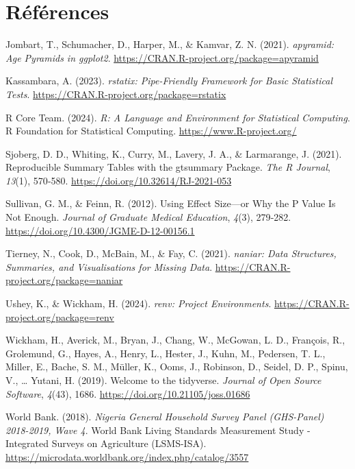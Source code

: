 \documentclass[
  10pt,
]{article}
\newlength{\cslhangindent}
\newenvironment{CSLReferences}[2] %
 {\begin{list}{}{%
  \setlength{\itemindent}{0pt}
  \setlength{\leftmargin}{0pt}
  \setlength{\parsep}{0pt}
  \ifodd #1
   \setlength{\leftmargin}{\cslhangindent}
   \setlength{\itemindent}{-1\cslhangindent}
  \fi
  \setlength{\itemsep}{#2\baselineskip}}}
 {\end{list}}
\begin{document}
\newpage{}

\section*{Références}\label{ruxe9fuxe9rences}

\label{refs}
\begin{CSLReferences}{1}{0}
Jombart, T., Schumacher, D., Harper, M., \& Kamvar, Z. N. (2021).
\emph{apyramid: Age Pyramids in ggplot2}.
\url{https://CRAN.R-project.org/package=apyramid}

Kassambara, A. (2023). \emph{rstatix: Pipe-Friendly Framework for Basic
Statistical Tests}. \url{https://CRAN.R-project.org/package=rstatix}

R Core Team. (2024). \emph{R: A Language and Environment for Statistical
Computing}. R Foundation for Statistical Computing.
\url{https://www.R-project.org/}

Sjoberg, D. D., Whiting, K., Curry, M., Lavery, J. A., \& Larmarange, J.
(2021). Reproducible Summary Tables with the gtsummary Package.
\emph{The R Journal}, \emph{13}(1), 570‑580.
\url{https://doi.org/10.32614/RJ-2021-053}

Sullivan, G. M., \& Feinn, R. (2012). Using Effect Size---or Why the P
Value Is Not Enough. \emph{Journal of Graduate Medical Education},
\emph{4}(3), 279‑282. \url{https://doi.org/10.4300/JGME-D-12-00156.1}

Tierney, N., Cook, D., McBain, M., \& Fay, C. (2021). \emph{naniar: Data
Structures, Summaries, and Visualisations for Missing Data}.
\url{https://CRAN.R-project.org/package=naniar}

Ushey, K., \& Wickham, H. (2024). \emph{renv: Project Environments}.
\url{https://CRAN.R-project.org/package=renv}

Wickham, H., Averick, M., Bryan, J., Chang, W., McGowan, L. D.,
François, R., Grolemund, G., Hayes, A., Henry, L., Hester, J., Kuhn, M.,
Pedersen, T. L., Miller, E., Bache, S. M., Müller, K., Ooms, J.,
Robinson, D., Seidel, D. P., Spinu, V., \ldots{} Yutani, H. (2019).
Welcome to the tidyverse. \emph{Journal of Open Source Software},
\emph{4}(43), 1686. \url{https://doi.org/10.21105/joss.01686}

World Bank. (2018). \emph{Nigeria General Household Survey Panel
(GHS-Panel) 2018-2019, Wave 4}. World Bank Living Standards Measurement
Study - Integrated Surveys on Agriculture (LSMS-ISA).
\url{https://microdata.worldbank.org/index.php/catalog/3557}

\end{CSLReferences}
\end{document}
